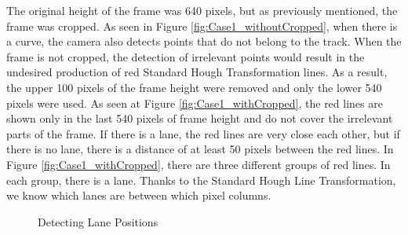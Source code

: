 The original height of the frame was 640 pixels, but as previously mentioned, the frame was cropped. As seen in Figure \ref{fig:Case1_withoutCropped}, when there is a curve, the camera also detects points that do not belong to the track. When the frame is not cropped, the detection of irrelevant points would result in the undesired production of red Standard Hough Transformation lines. As a result, the upper 100 pixels of the frame height were removed and only the lower 540 pixels were used. As seen at Figure \ref{fig:Case1_withCropped}, the red lines are shown only in the last 540 pixels of frame height and do not cover the irrelevant parts of the frame. If there is a lane, the red lines are very close each other, but if there is no lane, there is a distance of at least 50 pixels between the red lines. In Figure \ref{fig:Case1_withCropped}, there are three different groups of red lines. In each group, there is a lane. Thanks to the Standard Hough Line Transformation, we know which lanes are between which pixel columns.

\begin{figure}[H]
  \centering
  \hfill
  \caption{Detecting Lane Positions}
\end{figure}


